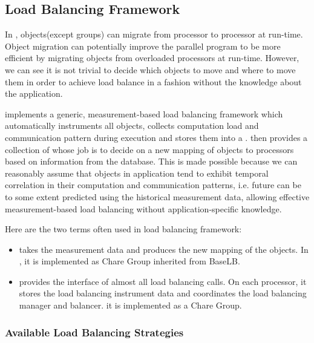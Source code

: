 \subsection{Load Balancing Framework}
\label{lbFramework}

In \charmpp{}, objects(except groups) can migrate from processor to 
processor at run-time. Object migration can potentially improve the parallel 
program to be more efficient by migrating objects from overloaded processors 
at run-time. However, we can see it is not trivial to decide 
which objects to move and where to move them in order to achieve load
balance in a fashion without the knowledge about the application. 

 \charmpp{} implements a generic, measurement-based load balancing framework 
which automatically instruments all \charmpp{} objects, collects computation 
load and communication pattern during execution and stores them into a 
. \charmpp{} then provides a collection of 
 whose job is to decide on a new mapping of 
objects to processors based on information from the database.
This is made possible because we can reasonably assume that objects 
in \charmpp{} application tend to exhibit temporal correlation in 
their computation and communication patterns, i.e. future can be to some 
extent predicted using the historical measurement data, allowing effective 
measurement-based load balancing without application-specific knowledge. 

Here are the two terms often used in \charmpp{} load balancing framework:
\begin{itemize}
\item {} takes the measurement
   data and produces the new mapping of the objects. In \charmpp{}, it is
   implemented as Chare Group inherited from BaseLB.
\item {} provides the interface of almost all
   load balancing calls. On each processor, it stores the load 
   balancing instrument data and coordinates the load balancing manager and 
   balancer. it is implemented as a Chare Group.
\end{itemize}

\subsubsection{Available Load Balancing Strategies}
\label{lbStrategy}

